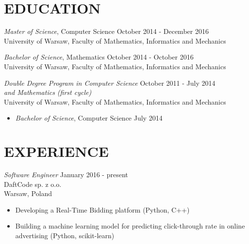 \documentclass[margin, 10pt]{res} %
\begin{document}
\begin{resume}


\section{EDUCATION}

{\sl Master of Science}, Computer Science \hfill October 2014 - December 2016 \\
University of Warsaw, Faculty of Mathematics, Informatics and Mechanics

{\sl Bachelor of Science}, Mathematics \hfill October 2014 - October 2016\\
University of Warsaw, Faculty of Mathematics, Informatics and Mechanics

{\sl Double Degree Program in Computer Science} \hfill October 2011 - July 2014 \\ {\sl and Mathematics (first cycle)} \\
University of Warsaw, Faculty of Mathematics, Informatics and Mechanics
\begin{itemize}
\item {\sl Bachelor of Science}, Computer Science \hfill July 2014
\end{itemize}
 
\section{EXPERIENCE}

{\sl Software Engineer} \hfill January 2016 - present \\
DaftCode sp. z o.o. \\
Warsaw, Poland

\begin{itemize} \itemsep -2pt %
\item Developing a Real-Time Bidding platform (Python, C++)
\item Building a machine learning model for predicting click-through rate in online advertising (Python, scikit-learn)
\end{itemize}


\end{resume}
\end{document}
